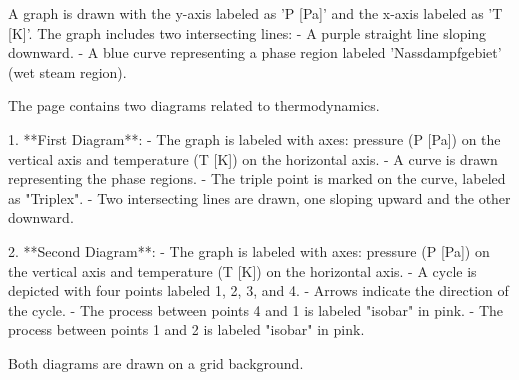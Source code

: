 A graph is drawn with the y-axis labeled as 'P [Pa]' and the x-axis labeled as 'T [K]'. The graph includes two intersecting lines:  
- A purple straight line sloping downward.  
- A blue curve representing a phase region labeled 'Nassdampfgebiet' (wet steam region).

The page contains two diagrams related to thermodynamics.  

1. **First Diagram**:  
   - The graph is labeled with axes: pressure (P [Pa]) on the vertical axis and temperature (T [K]) on the horizontal axis.  
   - A curve is drawn representing the phase regions.  
   - The triple point is marked on the curve, labeled as "Triplex".  
   - Two intersecting lines are drawn, one sloping upward and the other downward.  

2. **Second Diagram**:  
   - The graph is labeled with axes: pressure (P [Pa]) on the vertical axis and temperature (T [K]) on the horizontal axis.  
   - A cycle is depicted with four points labeled 1, 2, 3, and 4.  
   - Arrows indicate the direction of the cycle.  
   - The process between points 4 and 1 is labeled "isobar" in pink.  
   - The process between points 1 and 2 is labeled "isobar" in pink.  

Both diagrams are drawn on a grid background.